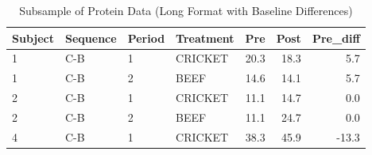 \begin{table}[H]

\caption{\label{tab:preDiffSubsample}Subsample of Protein Data (Long Format with Baseline Differences)}
\centering
\begin{tabular}[t]{llllrrr}
\toprule
Subject & Sequence & Period & Treatment & Pre & Post & Pre\_diff\\
\midrule
1 & C-B & 1 & CRICKET & 20.3 & 18.3 & 5.7\\
1 & C-B & 2 & BEEF & 14.6 & 14.1 & 5.7\\
2 & C-B & 1 & CRICKET & 11.1 & 14.7 & 0.0\\
2 & C-B & 2 & BEEF & 11.1 & 24.7 & 0.0\\
4 & C-B & 1 & CRICKET & 38.3 & 45.9 & -13.3\\
\bottomrule
\end{tabular}
\end{table}
